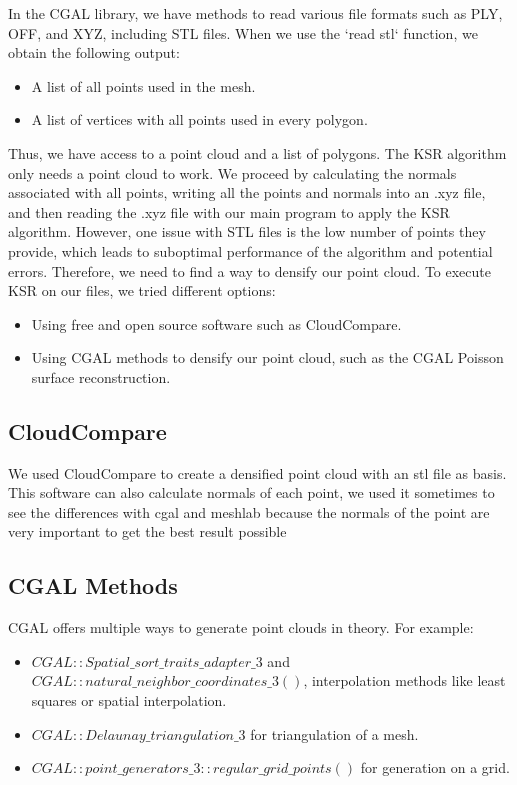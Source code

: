 \documentclass{article}
\begin{document}
In the CGAL library, we have methods to read various file formats such as PLY, OFF, and XYZ, including STL files. When we use the `read stl` function, we obtain the following output:

\begin{itemize}
  \item A list of all points used in the mesh.
  \item A list of vertices with all points used in every polygon.
\end{itemize}

Thus, we have access to a point cloud and a list of polygons. The KSR algorithm only needs a point cloud to work. We proceed by calculating the normals associated with all points, 
writing all the points and normals into an .xyz file, and then reading the .xyz file with our main program to apply the KSR algorithm.
However, one issue with STL files is the low number of points they provide, which leads to suboptimal performance of the algorithm and potential errors. Therefore, we need to find a way to densify our point cloud.
To execute KSR on our files, we tried different options:

\begin{itemize}
  \item Using free and open source software such as CloudCompare.
  \item Using CGAL methods to densify our point cloud, such as the CGAL Poisson surface reconstruction.
\end{itemize}

\subsection{CloudCompare}
We used CloudCompare to create a densified point cloud with an stl file as basis.
This software can also calculate normals of each point, we used it sometimes to 
see the differences with cgal and meshlab because the normals of the point are very important to get the best result possible 

\subsection{CGAL Methods}
CGAL offers multiple ways to generate point clouds in theory. For example:

\begin{itemize}
  \item $CGAL::Spatial\_sort\_traits\_adapter\_3$ and $CGAL::natural\_neighbor\_coordinates\_3()$, interpolation methods like least squares or spatial interpolation.
  \item $CGAL::Delaunay\_triangulation\_3$ for triangulation of a mesh.
  \item $CGAL::point\_generators\_3::regular\_grid\_points()$ for generation on a grid.
\end{itemize}
\end{document}
